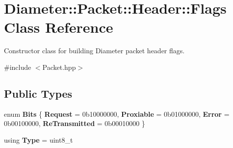 \hypertarget{classDiameter_1_1Packet_1_1Header_1_1Flags}{}\section{Diameter\+:\+:Packet\+:\+:Header\+:\+:Flags Class Reference}
\label{classDiameter_1_1Packet_1_1Header_1_1Flags}


Constructor class for building Diameter packet header flags.  




{\ttfamily \#include $<$Packet.\+hpp$>$}

\subsection*{Public Types}
\begin{DoxyCompactItemize}
\item 
\mbox{\label{classDiameter_1_1Packet_1_1Header_1_1Flags_ad7c19445ee575d84d8d7fcfdf5661b04}} 
enum {\bfseries Bits} \{ {\bfseries Request} = 0b10000000, 
{\bfseries Proxiable} = 0b01000000, 
{\bfseries Error} = 0b00100000, 
{\bfseries Re\+Transmitted} = 0b00010000
 \}
\item 
\mbox{\label{classDiameter_1_1Packet_1_1Header_1_1Flags_a89ab84d07504765f31b8c983689052ca}} 
using {\bfseries Type} = uint8\+\_\+t
\end{DoxyCompactItemize}

